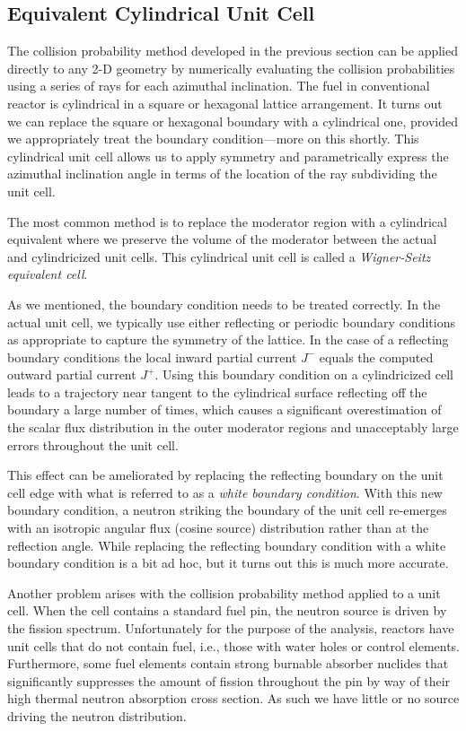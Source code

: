 \subsection{Equivalent Cylindrical Unit Cell}

The collision probability method developed in the previous section can be applied directly to any 2-D geometry by numerically evaluating the collision probabilities using a series of rays for each azimuthal inclination. The fuel in conventional reactor is cylindrical in a square or hexagonal lattice arrangement. It turns out we can replace the square or hexagonal boundary with a cylindrical one, provided we appropriately treat the boundary condition---more on this shortly. This cylindrical unit cell allows us to apply symmetry and parametrically express the azimuthal inclination angle in terms of the location of the ray subdividing the unit cell.

The most common method is to replace the moderator region with a cylindrical equivalent where we preserve the volume of the moderator between the actual and cylindricized unit cells. This cylindrical unit cell is called a \emph{Wigner-Seitz equivalent cell}.

As we mentioned, the boundary condition needs to be treated correctly. In the actual unit cell, we typically use either reflecting or periodic boundary conditions as appropriate to capture the symmetry of the lattice. In the case of a reflecting boundary conditions the local inward partial current $J^-$ equals the computed outward partial current $J^+$. Using this boundary condition on a cylindricized cell leads to a trajectory near tangent to the cylindrical surface reflecting off the boundary a large number of times, which causes a significant overestimation of the scalar flux distribution in the outer moderator regions and unacceptably large errors throughout the unit cell.

This effect can be ameliorated by replacing the reflecting boundary on the unit cell edge with what is referred to as a \emph{white boundary condition}. With this new boundary condition, a neutron striking the boundary of the unit cell re-emerges with an isotropic angular flux (cosine source) distribution rather than at the reflection angle. While replacing the reflecting boundary condition with a white boundary condition is a bit ad hoc, but it turns out this is much more accurate.

Another problem arises with the collision probability method applied to a unit cell. When the cell contains a standard fuel pin, the neutron source is driven by the fission spectrum. Unfortunately for the purpose of the analysis, reactors have unit cells that do not contain fuel, i.e., those with water holes or control elements. Furthermore, some fuel elements contain strong burnable absorber nuclides that significantly suppresses the amount of fission throughout the pin by way of their high thermal neutron absorption cross section. As such we have little or no source driving the neutron distribution.


